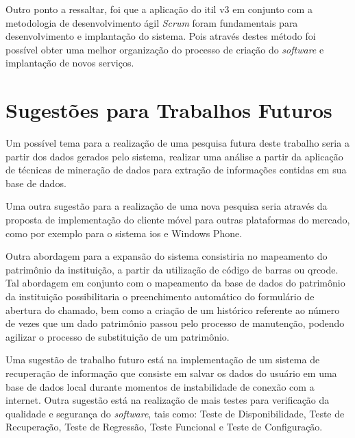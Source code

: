 Outro ponto a ressaltar, foi que a aplicação do \acrshort{itil} v3 em conjunto com a metodologia de desenvolvimento ágil \textit{Scrum} foram fundamentais para desenvolvimento e implantação do sistema. Pois através destes método foi possível obter uma melhor organização do processo de criação do \textit{software} e implantação de novos serviços.

\section{Sugestões para Trabalhos Futuros}

\noindent Um possível tema para a realização de uma pesquisa futura deste trabalho seria a partir dos dados gerados pelo sistema, realizar uma análise a partir da aplicação de técnicas de mineração de dados para extração de informações contidas em sua base de dados.

Uma outra sugestão para a realização de uma nova pesquisa seria através da proposta de implementação do cliente móvel para outras plataformas do mercado, como por exemplo para o sistema  \acrshort{ios} e Windows Phone. 

Outra abordagem para a expansão do sistema consistiria no mapeamento do patrimônio da instituição, a partir da utilização de código de barras ou \gls{qrcode}. Tal abordagem em conjunto com o mapeamento da base de dados do patrimônio da instituição possibilitaria o preenchimento automático do formulário de abertura do chamado, bem como a criação de um histórico referente ao número de vezes que um dado patrimônio passou pelo processo de manutenção, podendo agilizar o processo de substituição de um patrimônio.

Uma sugestão de trabalho futuro está na implementação de um sistema de recuperação de informação que consiste em salvar os dados do usuário em uma base de dados local durante momentos de instabilidade de conexão com a internet. Outra sugestão está na realização de mais testes para verificação da qualidade e segurança do \textit{software}, tais como: Teste de Disponibilidade, Teste de Recuperação, Teste de Regressão, Teste Funcional e Teste de Configuração.